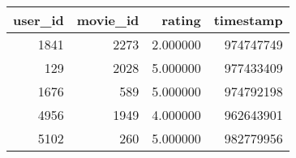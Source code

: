 \begin{tabular}{rrrr}
\toprule
user_id & movie_id & rating & timestamp \\
\midrule
1841 & 2273 & 2.000000 & 974747749 \\
129 & 2028 & 5.000000 & 977433409 \\
1676 & 589 & 5.000000 & 974792198 \\
4956 & 1949 & 4.000000 & 962643901 \\
5102 & 260 & 5.000000 & 982779956 \\
\bottomrule
\end{tabular}
